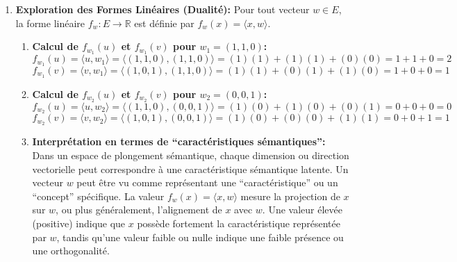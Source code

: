 \documentclass[11pt,a4paper]{report}
\begin{document}
\begin{enumerate}
  Géométriquement, la matrice \(M\) correspond à une projection
  orthogonale sur le plan \(xy\) (le plan d'équation \(z=0\)). En effet,
  elle conserve les composantes \(x\) et \(y\) et annule la composante
  \(z\). Le vecteur \(u = (1, 1, 0)\) est déjà dans le plan \(xy\), donc
  \(L(u) = u\). Le vecteur \(v = (1, 0, 1)\) a une composante \(z\) non
  nulle. Sa projection \(L(v) = (1, 0, 0)\) est le vecteur \(v\)
  ``aplati'' sur le plan \(xy\). L'angle entre \(u\) et \(v\) était
  \(\arccos(1/2) = 60^\circ\). L'angle entre \(u'\) et \(v'\) est
  \(\arccos(\sqrt{2}/2) = 45^\circ\). La projection a rapproché les
  vecteurs en termes d'angle, car la composante \(z\) de \(v\) qui
  l'éloignait de \(u\) a été supprimée. Dans le contexte des plongements
  sémantiques, cela signifie que si la dimension \(z\) représentait une
  caractéristique non pertinente ou du ``bruit'' pour la similarité
  entre \(u\) et \(v\), sa suppression a rendu les concepts \(u\) et
  \(v\) plus similaires dans l'espace de caractéristiques réduit.
\item
  \textbf{Exploration des Formes Linéaires (Dualité):} Pour tout vecteur
  \(w \in E\), la forme linéaire \(f_w: E \to \mathbb{R}\) est définie
  par \(f_w(x) = \langle x, w \rangle\).

  \begin{enumerate}
  \def\labelenumii{\alph{enumii}.}
  \item
    \textbf{Calcul de \(f_{w_1}(u)\) et \(f_{w_1}(v)\) pour
    \(w_1 = (1, 1, 0)\):}
    \[ f_{w_1}(u) = \langle u, w_1 \rangle = \langle (1, 1, 0), (1, 1, 0) \rangle = (1)(1) + (1)(1) + (0)(0) = 1 + 1 + 0 = 2 \]
    \[ f_{w_1}(v) = \langle v, w_1 \rangle = \langle (1, 0, 1), (1, 1, 0) \rangle = (1)(1) + (0)(1) + (1)(0) = 1 + 0 + 0 = 1 \]
  \item
    \textbf{Calcul de \(f_{w_2}(u)\) et \(f_{w_2}(v)\) pour
    \(w_2 = (0, 0, 1)\):}
    \[ f_{w_2}(u) = \langle u, w_2 \rangle = \langle (1, 1, 0), (0, 0, 1) \rangle = (1)(0) + (1)(0) + (0)(1) = 0 + 0 + 0 = 0 \]
    \[ f_{w_2}(v) = \langle v, w_2 \rangle = \langle (1, 0, 1), (0, 0, 1) \rangle = (1)(0) + (0)(0) + (1)(1) = 0 + 0 + 1 = 1 \]
  \item
    \textbf{Interprétation en termes de ``caractéristiques
    sémantiques'':} Dans un espace de plongement sémantique, chaque
    dimension ou direction vectorielle peut correspondre à une
    caractéristique sémantique latente. Un vecteur \(w\) peut être vu
    comme représentant une ``caractéristique'' ou un ``concept''
    spécifique. La valeur \(f_w(x) = \langle x, w \rangle\) mesure la
    projection de \(x\) sur \(w\), ou plus généralement, l'alignement de
    \(x\) avec \(w\). Une valeur élevée (positive) indique que \(x\)
    possède fortement la caractéristique représentée par \(w\), tandis
    qu'une valeur faible ou nulle indique une faible présence ou une
    orthogonalité.
  \end{enumerate}


\end{enumerate}
\end{document}
